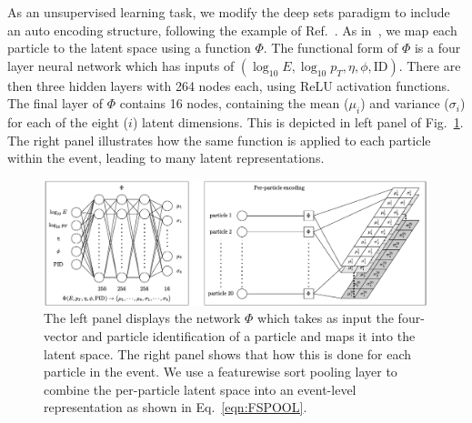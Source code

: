 \documentclass[submission, Phys]{SciPost}
\begin{document}
As an unsupervised learning task, we modify the deep sets paradigm to include an auto encoding structure, following the example of Ref.~\cite{2019arXiv190606565Z}.
As in~\cite{2019JHEP...01..121K}, we map each particle to the latent space using a function $\Phi$.
The functional form of $\Phi$ is a four layer neural network which has inputs of $(\log_{10} E, \log_{10} p_T, \eta, \phi, \text{ID})$.
There are then three hidden layers with 264 nodes each, using ReLU activation functions.
The final layer of $\Phi$ contains 16 nodes, containing the mean ($\mu_i$) and variance ($\sigma_i$) for each of the eight ($i$) latent dimensions.
This is depicted in left panel of Fig.~\ref{fig:Encoder}.
The right panel illustrates how the same function is applied to each particle within the event, leading to many latent representations.

\begin{figure}[t]
    \includegraphics[width=\linewidth]{figures/DeepSetsEncoder.pdf}
    \caption{The left panel displays the network $\Phi$ which takes as input the four-vector and particle identification of a particle and maps it into the latent space.
    The right panel shows that how this is done for each particle in the event.
    We use a featurewise sort pooling layer to combine the per-particle latent space into an event-level representation as shown in Eq.~\eqref{eqn:FSPOOL}.}
    \label{fig:Encoder}
\end{figure}
\end{document}
